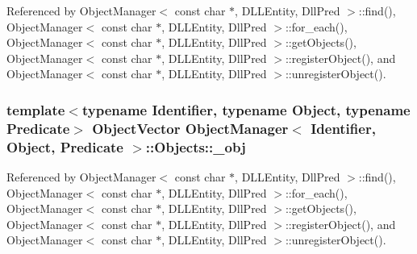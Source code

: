 Referenced by ObjectManager$<$ const char $\ast$, DLLEntity, DllPred $>$::find(), ObjectManager$<$ const char $\ast$, DLLEntity, DllPred $>$::for\_\-each(), ObjectManager$<$ const char $\ast$, DLLEntity, DllPred $>$::getObjects(), ObjectManager$<$ const char $\ast$, DLLEntity, DllPred $>$::registerObject(), and ObjectManager$<$ const char $\ast$, DLLEntity, DllPred $>$::unregisterObject().

\subsubsection[{\_\-obj}]{\setlength{\rightskip}{0pt plus 5cm}template$<$typename Identifier, typename Object, typename Predicate$>$ {\bf ObjectVector} {\bf ObjectManager}$<$ Identifier, Object, Predicate $>$::{\bf Objects::\_\-obj}}\label{structObjectManager_1_1Objects_a74ee31f4dee7742b10865096f5b23bc7}


Referenced by ObjectManager$<$ const char $\ast$, DLLEntity, DllPred $>$::find(), ObjectManager$<$ const char $\ast$, DLLEntity, DllPred $>$::for\_\-each(), ObjectManager$<$ const char $\ast$, DLLEntity, DllPred $>$::getObjects(), ObjectManager$<$ const char $\ast$, DLLEntity, DllPred $>$::registerObject(), and ObjectManager$<$ const char $\ast$, DLLEntity, DllPred $>$::unregisterObject().

